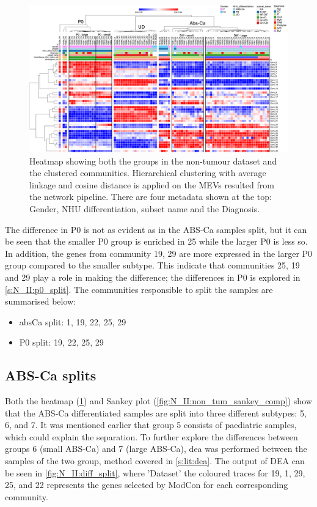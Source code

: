 \begin{figure}
    \includegraphics[width=1.0\textwidth,height=1.0\textheight,keepaspectratio]{Sections/Network_II/resources/non_tum/norm_healthy_std_3.1.png}
    \caption[Heatmap of the new non-tumour subgroups]{Heatmap showing both the groups in the non-tumour dataset and the clustered communities. Hierarchical clustering with average linkage and cosine distance is applied on the MEVs resulted from the network pipeline. There are four metadata shown at the top: Gender, NHU differentiation, subset name and the Diagnosis. }
    \label{fig:N_II:morph_non_tum}
\end{figure}


The difference in P0 is not as evident as in the ABS-Ca samples split, but it can be seen that the smaller P0 group is enriched in 25 while the larger P0 is less so. In addition, the genes from community 19, 29 are more expressed in the larger P0 group compared to the smaller subtype. This indicate that communities 25, 19 and 29 play a role in making the difference; the differences in P0 is explored in \cref{s:N_II:p0_split}. The communities responsible to split the samples are summarised below:
\begin{itemize}
    \item \acrshort{absCa} split: 1, 19, 22, 25, 29
    \item P0 split: 19, 22, 25, 29
\end{itemize}

\subsection{ABS-Ca splits} \label{s:N_II:diff_split}

Both the heatmap (\cref{fig:N_II:morph_non_tum}) and Sankey plot (\cref{fig:N_II:non_tum_sankey_comp}) show that the ABS-Ca differentiated samples are split into three different subtypes: 5, 6, and 7. It was mentioned earlier that group 5 consists of paediatric samples, which could explain the separation. To further explore the differences between groups 6 (small ABS-Ca) and 7 (large ABS-Ca), \acrlong{dea} was performed between the samples of the two group, method covered in \cref{s:lit:dea}. The output of DEA can be seen in \cref{fig:N_II:diff_split}, where 'Dataset' the coloured traces for 19, 1, 29, 25, and 22 represents the genes selected by ModCon for each corresponding community.

